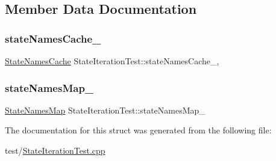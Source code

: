 \subsection{Member Data Documentation}
\mbox{\label{struct_state_iteration_test_a49903d50153012f61f1807953c233bad}} 
\subsubsection{\texorpdfstring{state\+Names\+Cache\+\_\+}{stateNamesCache\_}}
{\footnotesize\ttfamily \mbox{\hyperlink{struct_state_iteration_test_a7650cbecc238cfbab3f9ff1f6707a826}{State\+Names\+Cache}} State\+Iteration\+Test\+::state\+Names\+Cache\+\_\+\hspace{0.3cm}{\ttfamily [mutable]}, {\ttfamily [private]}}

\mbox{\label{struct_state_iteration_test_ac5d2940aa9baaa9d1f6e08a5563792f4}} 
\subsubsection{\texorpdfstring{state\+Names\+Map\+\_\+}{stateNamesMap\_}}
{\footnotesize\ttfamily \mbox{\hyperlink{struct_state_iteration_test_ad2b113061c6f1d153adf3013b32e75c0}{State\+Names\+Map}} State\+Iteration\+Test\+::state\+Names\+Map\+\_\+\hspace{0.3cm}{\ttfamily [private]}}



The documentation for this struct was generated from the following file\+:\begin{DoxyCompactItemize}
\item 
test/\mbox{\hyperlink{_state_iteration_test_8cpp}{State\+Iteration\+Test.\+cpp}}\end{DoxyCompactItemize}
